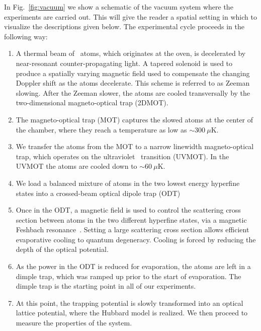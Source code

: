 In Fig.~\ref{fig:vacuum} we show a schematic of the vacuum system where the
experiments are carried out.  This will give the reader a spatial setting in
which to visualize the descriptions given below.  The experimental cycle
proceeds in the following way:  
\begin{enumerate} 
\item A thermal beam of \li\ atoms, which originates at the oven, is
decelerated by near-resonant counter-propagating light.  A tapered solenoid is
used to produce a spatially varying magnetic field used to compensate the
changing Doppler shift as the atoms decelerate.   This scheme is referred to as
Zeeman slowing.  After the Zeeman slower, the atoms are  cooled transversally
by the two-dimensional magneto-optical trap (2DMOT). 

\item  The magneto-optical trap (MOT) captures the slowed atoms at the center
of the chamber, where they reach a temperature as low as $\sim300~\mu$K.  

\item  We transfer the atoms from the MOT to a narrow linewidth magneto-optical
trap, which operates on the ultraviolet \uv\ transition (UVMOT).  In the UVMOT
the atoms are cooled down to $\sim60~\mu$K.  

\item  We load a balanced mixture of atoms in the two lowest energy hyperfine
states into a crossed-beam optical dipole trap (ODT)

\item  Once in the ODT, a magnetic field is used to control the scattering
cross section between atoms in the two different hyperfine states, via a
magnetic Feshbach resonance~\cite{Houbiers1998}.   Setting a large scattering
cross section allows efficient evaporative cooling to quantum degeneracy.
Cooling is forced by reducing the depth of the optical potential. 

\item As the power in the ODT is reduced for evaporation, the atoms are left in
a dimple trap,  which was ramped up prior to the start of evaporation.   The
dimple trap is the starting point in all of our experiments.   

\item At this point, the trapping potential is slowly transformed into an
optical lattice potential, where the Hubbard model is realized. We then proceed
to measure the properties of the system.  
\end{enumerate}

